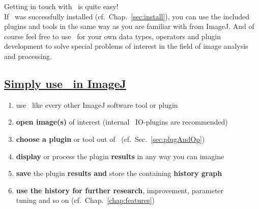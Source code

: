 Getting in touch with \mitobo\ is quite easy!\\
If \mitobo\ was successfully installed (cf.~Chap.~\ref{sec:install}), you
can use the included plugins and tools in the same way as you are familiar with 
from ImageJ. And of course feel free to use \mitobo\ for your own data types,
operators and plugin development to solve special problems of interest in the
field of image analysis and processing.\\
\subsection*{\underline{Simply use \mitobo\ in ImageJ}}
   \begin{enumerate}
    \item use \mitobo\ like every other ImageJ software tool or plugin
    \item \textbf{open image(s)} of interest (internal \mitobo\ IO-plugins are
          recommended)
    \item \textbf{choose a plugin} or tool out of \mitobo\
          (cf.~Sec.~\ref{sec:plugAndOp})
    \item \textbf{display} or process the plugin \textbf{results} in any way you
          can imagine
    \item \textbf{save} the plugin \textbf{results and} store the containing
          \textbf{history graph}
    \item \textbf{use the history for further research}, improvement,
          parameter\\tuning and so on (cf.~Chap.~\ref{chap:features})\\
\end{enumerate}

